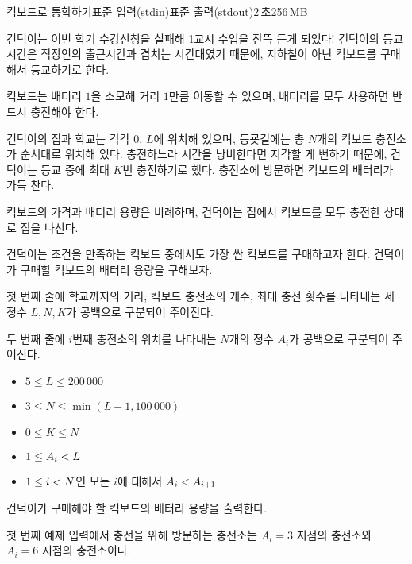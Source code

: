 \begin{problem}{킥보드로 통학하기}{표준 입력(stdin)}{표준 출력(stdout)}{2\,초}{256\,MB}

건덕이는 이번 학기 수강신청을 실패해 1교시 수업을 잔뜩 듣게 되었다! 건덕이의 등교시간은 직장인의 출근시간과 겹치는 시간대였기 때문에, 지하철이 아닌 킥보드를 구매해서 등교하기로 한다.

킥보드는 배터리 $1$을 소모해 거리 $1$만큼 이동할 수 있으며, 배터리를 모두 사용하면 반드시 충전해야 한다.

건덕이의 집과 학교는 각각 $0$, $L$에 위치해 있으며, 등굣길에는 총 $N$개의 킥보드 충전소가 순서대로 위치해 있다. 충전하느라 시간을 낭비한다면 지각할 게 뻔하기 때문에, 건덕이는 등교 중에 최대 $K$번 충전하기로 했다. 충전소에 방문하면 킥보드의 배터리가 가득 찬다.

킥보드의 가격과 배터리 용량은 비례하며, 건덕이는 집에서 킥보드를 모두 충전한 상태로 집을 나선다. 

건덕이는 조건을 만족하는 킥보드 중에서도 가장 싼 킥보드를 구매하고자 한다. 건덕이가 구매할 킥보드의 배터리 용량을 구해보자. 

\InputFile
첫 번째 줄에 학교까지의 거리, 킥보드 충전소의 개수, 최대 충전 횟수를 나타내는 세 정수 $L, N, K$가 공백으로 구분되어 주어진다.

두 번째 줄에 $i$번째 충전소의 위치를 나타내는 $N$개의 정수 $A_i$가 공백으로 구분되어 주어진다.

\newcommand{\lt}{\ensuremath <}
\newcommand{\gt}{\ensuremath >}
\begin{itemize}
 \item $5 \le L \le 200\,000$

 \item $3 \le N \le \min(L - 1, 100\,000)$

 \item $0 \le K \le N$

 \item $1 \le A_i \lt L$

 \item $1 \le i \lt N$인 모든 $i$에 대해서 $A_i \lt A_{i+1}$
\end{itemize}


\OutputFile
건덕이가 구매해야 할 킥보드의 배터리 용량을 출력한다.

\Examples

\begin{example}
%
%
\end{example}
\Note
첫 번째 예제 입력에서 충전을 위해 방문하는 충전소는 $A_i = 3$ 지점의 충전소와 $A_i = 6$ 지점의 충전소이다.

\end{problem}
